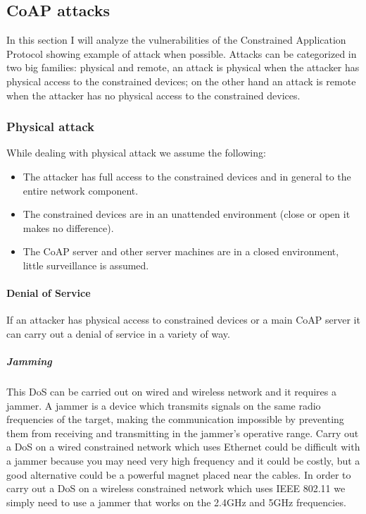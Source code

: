 	\subsection{CoAP attacks}
	
	In this section I will analyze the vulnerabilities of the Constrained Application Protocol showing example of attack when possible.\newline
	Attacks can be categorized in two big families: physical and remote, an attack is physical when the attacker has physical access to the constrained devices;
	on the other hand an attack is remote when the attacker has no physical access to the constrained devices.\newline
	
	\subsubsection{Physical attack}
	While dealing with physical attack we assume the following:
	\begin{itemize}
		\item The attacker has full access to the constrained devices and in general to the entire network component.
		\item The constrained devices are in an unattended environment (close or open it makes no difference).
		\item The CoAP server and other server machines are in a closed environment, little surveillance is assumed.
	\end{itemize}
	
	\paragraph{Denial of Service}
	
	If an attacker has physical access to constrained devices or a main CoAP server it can carry out a denial of service in a variety of way.\newline
	\subparagraph{Jamming}
	This DoS can be carried out on wired and wireless network and it requires a jammer.\newline
	A jammer is a device which transmits signals on the same radio frequencies of the target, making the communication impossible by preventing them from receiving and transmitting in the jammer’s operative range.\newline
	Carry out a DoS on a wired constrained network which uses Ethernet could be difficult with a jammer because you may need very high frequency and it could be costly, but a good alternative could be a powerful magnet placed near the cables.\newline
	In order to carry out a DoS on a wireless constrained network which uses IEEE 802.11 we simply need to use a jammer that works on the 2.4GHz and 5GHz frequencies.\newline
	
